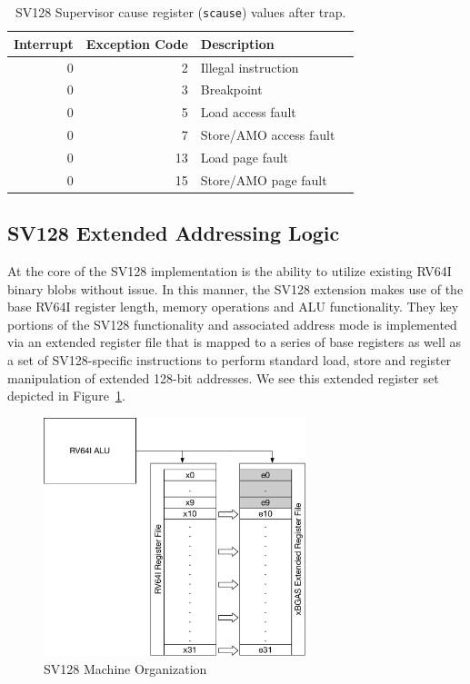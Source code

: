 \documentclass{article}
\begin{document}
\begin{table}[h!]
\begin{center}
\begin{tabular}{|r|r|l|l|}

  \hline
  Interrupt & Exception Code  & Description \\
  \hline	 
  0         & 2               & Illegal instruction \\   
  0         & 3               & Breakpoint \\
  0         & 5               & Load access fault \\
  0         & 7               & Store/AMO access fault \\
  0         & 13              & Load page fault \\
  0         & 15              & Store/AMO page fault \\
  \hline
\end{tabular}
\end{center}
\caption{SV128 Supervisor cause register ({\tt scause}) values after trap.}
\label{scauses}
\end{table}

\subsection{SV128 Extended Addressing Logic}

At the core of the SV128 implementation is the ability to utilize existing RV64I 
binary blobs without issue.  In this manner, the SV128 extension makes use 
of the base RV64I register length, memory operations and ALU functionality.  
They key portions of the SV128 functionality and associated address mode 
is implemented via an extended register file that is mapped to a series 
of base registers as well as a set of SV128-specific instructions to perform 
standard load, store and register manipulation of extended 128-bit addresses.  We 
see this extended register set depicted in Figure~\ref{fig:machineorganization}.  

\begin{figure}[h!]
\begin{center}
\includegraphics[width=3in]{figures/rv128imachorg.pdf}
\caption{SV128 Machine Organization}
\label{fig:machineorganization}
\end{center}
\end{figure}
\end{document}
